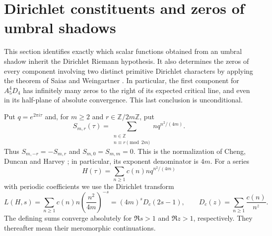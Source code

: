 \section{Dirichlet constituents and zeros of umbral shadows}
\label{sec:shadow-dirichlet}
This section identifies exactly which scalar functions obtained from an umbral
shadow inherit the Dirichlet Riemann hypothesis.  It also determines the zeros
of every component involving two distinct primitive Dirichlet characters by
applying the theorem of Saias and Weingartner \cite[pp.~335--336]{SW2009}.
In particular, the first component for $A_5^4D_4$ has infinitely many zeros to
the right of its expected critical line, and even in its half-plane of absolute
convergence.  This last conclusion is unconditional.

Put $q=e^{2\pi i\tau}$ and, for $m\geq2$ and $r\in\mathbb Z/2m\mathbb Z$, put
\begin{equation}\label{eq:unary-definition}
 S_{m,r}(\tau)=\sum_{\substack{n\in\mathbb Z\\n\equiv r\pmod{2m}}}
 n q^{n^2/(4m)}.
\end{equation}
Thus $S_{m,-r}=-S_{m,r}$ and $S_{m,0}=S_{m,m}=0$.
This is the normalization of Cheng, Duncan and Harvey
\cite[Sect.~3.4, equation (3.39), p.~37]{CDH2014}; in particular, its exponent denominator
is $4m$.  For a series
\[
 H(\tau)=\sum_{n\geq1}c(n)nq^{n^2/(4m)}
\]
with periodic coefficients we use the Dirichlet transform
\begin{equation}\label{eq:shadow-L-normalization}
 L(H,s)=\sum_{n\geq1}c(n)n\left(\frac{n^2}{4m}\right)^{-s}
       =(4m)^sD_c(2s-1),\qquad
 D_c(z)=\sum_{n\geq1}\frac{c(n)}{n^z}.
\end{equation}
The defining sums converge absolutely for $\Re s>1$ and $\Re z>1$,
respectively.  They thereafter mean their meromorphic continuations.

